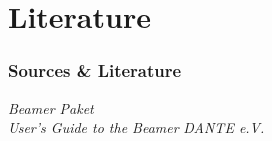 \documentclass{beamer}	%
\begin{document}
\section[Bibliography]{Literature}
\begin{frame}\frametitle{Sources \& Literature}

\begin{thebibliography}{9}
 \emph{Beamer Paket} \\ 
 \emph{User's Guide to the Beamer} 
 \emph{DANTE e.V.}    
\end{thebibliography}


\end{frame}
\end{document}
